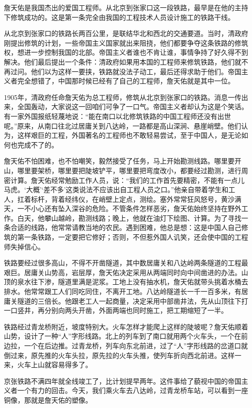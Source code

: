 \documentclass[12pt,UTF-8,openany]{ctexbook}
\begin{document}
\begin{Large}
    
    詹天佑是我国杰出的爱国工程师。从北京到张家口这一段铁路，最早是在他的主持下修筑成功的。这是第一条完全由我国的工程技术人员设计施工的铁路干线。
    
    从北京到张家口的铁路长两百公里，是联结华北和西北的交通要道。当时，清政府刚提出修筑的计划，一些帝国主义国家就出来阻挠，他们都要争夺这条铁路的修筑权，想进一步控制我国的北部。帝国主义者谁也不肯让谁，事情争持了好久得不到解决。他们最后提出一个条件：清政府如果用本国的工程师来修筑铁路，他们就不再过问。他们以为这样一要挟，铁路就没法子动工，最后还得求助于他们。帝国主义者完全想错了，中国那时候已经有了自己的工程师，詹天佑就是其中一位。
    
    1905年，清政府任命詹天佑为总工程师，修筑从北京到张家口的铁路。消息一传出来，全国轰动，大家说这一回咱们可争了一口气。帝国主义者却认为这是个笑话。有一家外国报纸轻蔑地说：“能在南口以北修筑铁路的中国工程师还没有出世呢。”原来，从南口往北过居庸关到八达岭，一路都是高山深涧、悬崖峭壁。他们认为，这样艰巨的工程，外国著名的工程师也不敢轻易尝试，至于中国人，是无论如何也完成不了的。
    
    詹天佑不怕困难，也不怕嘲笑，毅然接受了任务，马上开始勘测线路。哪里要开山，哪里要架桥，哪里要把陡坡铲平，哪里要把弯度改小，都要经过勘测，进行周密计算。詹天佑经常勉励工作人员，说：“我们的工作首先要精密，不能有一点儿马虎。‘大概’‘差不多’这类说法不应该出自工程人员之口。”他亲自带着学生和工人，扛着标杆，背着经纬仪，在峭壁上定点，测绘。塞外常常狂风怒号，黄沙满天，一不小心还有坠入深谷的危险。不管条件怎样恶劣，詹天佑始终坚持在野外工作。白天，他攀山越岭，勘测线路；晚上，他就在油灯下绘图、计算。为了寻找一条合适的线路，他常常请教当地的农民。遇到困难，他总是想：这是中国人自己修筑的第一条铁路，一定要把它修好；否则，不但惹外国人讥笑，还会使中国的工程师失掉信心。
    
    铁路要经过很多高山，不得不开凿隧道，其中数居庸关和八达岭两条隧道的工程最艰巨。居庸关山势高，岩层厚，詹天佑决定采用从两端同时向中间凿进的办法。山顶的泉水往下渗，隧道里满是泥浆。工地上没有抽水机，詹天佑就带头挑着水桶去排水。他常常跟工人们同吃同住，不离开工地。八达岭隧道长一千一百多米，有居庸关隧道的三倍长。他跟老工人一起商量，决定采用中部凿井法，先从山顶往下打一口竖井，再分别向两头开凿，外面两端也同时施工，把工期缩短了一半。
    
    铁路经过青龙桥附近，坡度特别大。火车怎样才能爬上这样的陡坡呢？詹天佑顺着山势，设计了一种“人”字形线路。北上的列车到了南口就用两个火车头，一个在前边拉，一个在后边推。过青龙桥，列车向东北前进，过了“人”字形线路的岔道口就倒过来，原先推的火车头拉，原先拉的火车头推，使列车折向西北前进。这样一来，火车上山就容易得多了。
    
    京张铁路不满四年就全线竣工了，比计划提早两年。这件事给了藐视中国的帝国主义者一个有力的回击。今天，我们乘火车去八达岭，过青龙桥车站，可以看到一座铜像，那就是詹天佑的塑像。
    
\end{Large}
\end{document}
